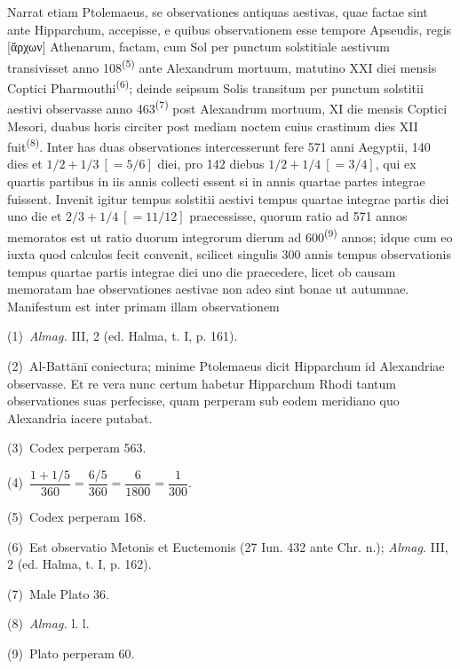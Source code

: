 \documentclass[10pt,a4paper]{article}
\newcommand{\A}[1]{\hypertarget{#1}{}}
\newcommand{\NM}[1]{\textsuperscript{(#1)}}
\newcommand{\NN}[2]{%
  \par\noindent\textup{(#1)}\ #2%
}
\begin{document}
\A{AB01-PDF0130-P03}
Narrat etiam Ptolemaeus, se observationes antiquas aestivas, quae
factae sint ante Hipparchum, accepisse, e quibus observationem esse
tempore Apseudis, regis [ἄρχων] Athenarum, factam, cum Sol
per punctum solstitiale aestivum transivisset anno 108\NM{5} ante
Alexandrum mortuum, matutino XXI diei mensis Coptici
Pharmouthi\NM{6}; deinde seipsum Solis transitum per punctum
solstitii aestivi observasse anno 463\NM{7} post Alexandrum
mortuum, XI die mensis Coptici Mesori, duabus horis circiter post
mediam noctem cuius crastinum dies XII fuit\NM{8}. Inter has duas
observationes intercesserunt fere 571 anni Aegyptii, 140 dies et
$1/2+1/3\ [=5/6]$ diei, pro 142 diebus $1/2+1/4\ [=3/4]$, qui ex
quartis partibus in iis annis collecti essent si in annis quartae
partes integrae fuissent. Invenit igitur tempus solstitii aestivi
tempus quartae integrae partis diei uno die et
$2/3+1/4\ [=11/12]$ praecessisse, quorum ratio ad 571 annos
memoratos est ut ratio duorum integrorum dierum ad 600\NM{9}
annos; idque cum eo iuxta quod calculos fecit convenit, scilicet
singulis 300 annis tempus observationis tempus quartae partis
integrae diei uno die praecedere, licet ob causam memoratam hae
observationes aestivae non adeo sint bonae ut autumnae. Manifestum
est inter primam illam observationem

\begin{multicols}{2}
\footnotesize

\A{AB01-PDF0130-N01}
\NN{1}{{\itshape Almag.} III, 2 (ed. Halma, t. I, p. 161).}

\A{AB01-PDF0130-N02}
\NN{2}{Al-Battānī coniectura; minime Ptolemaeus dicit Hipparchum
id Alexandriae observasse. Et re vera nunc certum habetur
Hipparchum Rhodi tantum observationes suas perfecisse, quam
perperam sub eodem meridiano quo Alexandria iacere putabat.}

\A{AB01-PDF0130-N03}
\NN{3}{Codex perperam 563.}

\A{AB01-PDF0130-N04}
\NN{4}{$\dfrac{1+1/5}{360}=\dfrac{6/5}{360}=\dfrac{6}{1800}=\dfrac{1}{300}$.}

\A{AB01-PDF0130-N05}
\NN{5}{Codex perperam 168.}

\A{AB01-PDF0130-N06}
\NN{6}{Est observatio Metonis et Euctemonis
(27 Iun. 432 ante Chr. n.); {\itshape Almag.} III, 2
(ed. Halma, t. I, p. 162).}

\A{AB01-PDF0130-N07}
\NN{7}{Male Plato 36.}

\A{AB01-PDF0130-N08}
\NN{8}{{\itshape Almag.} l. l.}

\A{AB01-PDF0130-N09}
\NN{9}{Plato perperam 60.}

\end{multicols}
\end{document}
